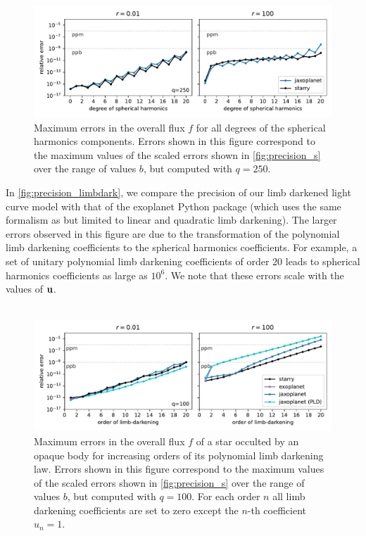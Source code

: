 \documentclass[modern]{aastex631}
\begin{document}
\begin{figure}[H]
    \begin{center}
        \includegraphics[width=\textwidth]{../workflows/precision/figures/error_degree.pdf}
        \caption{Maximum errors in the overall flux $f$ for all degrees of the spherical harmonics components. Errors shown in this figure correspond to the maximum values of the scaled errors shown in \autoref{fig:precision_s} over the range of values $b$, but computed with $q=250$. }
        \label{fig:precision_degree}
    \end{center}
\end{figure}
In \autoref{fig:precision_limbdark}, we compare the precision of our limb darkened light curve model with that of the \textsf{exoplanet} Python package (which uses the same formalism as \cite{Agol2020} but limited to linear and quadratic limb darkening). The larger errors observed in this figure are due to the transformation of the polynomial limb darkening coefficients to the spherical harmonics coefficients. For example, a set of unitary polynomial limb darkening coefficients of order 20 leads to spherical harmonics coefficients as large as $10^6$. We note that these errors scale with the values of ${\mathbf{u}}$.\\\\
\begin{figure}[H]
    \begin{center}
        \includegraphics[width=\textwidth]{../workflows/precision/figures/limbdark_error.PDF}
        \caption{Maximum errors in the overall flux $f$ of a star occulted by an opaque body for increasing orders of its polynomial limb darkening law. Errors shown in this figure correspond to the maximum values of the scaled errors shown in \autoref{fig:precision_s} over the range of values $b$, but computed with $q=100$. For each order $n$ all limb darkening coefficients are set to zero except the $n$-th coefficient $u_n=1$. }
        \label{fig:precision_limbdark}
    \end{center}
\end{figure}
\end{document}
